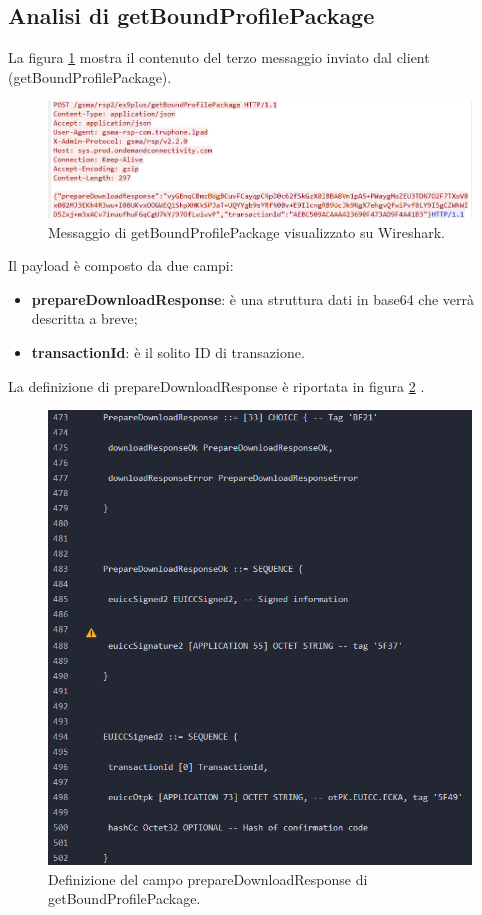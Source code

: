 \documentclass[10pt, oneside]{book}
\begin{document}
\subsection{Analisi di getBoundProfilePackage}
La figura \ref{fig:msg5-stream-pcap} mostra il contenuto del terzo messaggio inviato dal client (getBoundProfilePackage).\\
\begin{figure}
\includegraphics[width=\linewidth]{msg5-stream-pcap.png}
\caption{Messaggio di getBoundProfilePackage visualizzato su Wireshark.}
\label{fig:msg5-stream-pcap}
\end{figure}
Il payload è composto da due campi:
\begin{itemize}
\item \textbf{prepareDownloadResponse}: è una struttura dati in base64 che verrà descritta a breve;
\item \textbf{transactionId}: è il solito ID di transazione.
\end{itemize}
La definizione di prepareDownloadResponse è riportata in figura \ref{fig:def-prepareDownloadResponse} \cite{RSP-definitions}.\\
\begin{figure}
\includegraphics[width=\linewidth]{def-prepareDownloadResponse.png}
\caption{Definizione del campo prepareDownloadResponse di getBoundProfilePackage.}
\label{fig:def-prepareDownloadResponse}
\end{figure}
\end{document}
